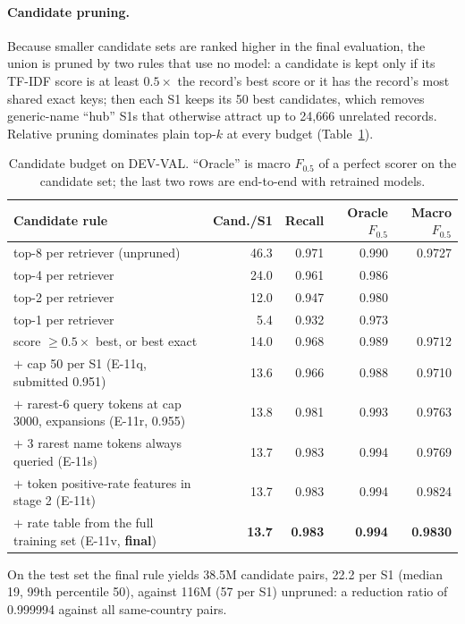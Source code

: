 \documentclass[10pt]{article}
\newcommand{\Fh}{F_{0.5}}
\begin{document}
\paragraph{Candidate pruning.} Because smaller candidate sets are ranked higher in the final evaluation, the union is pruned by two rules that use no model: a candidate is kept only if its TF-IDF score is at least $0.5\times$ the record's best score or it has the record's most shared exact keys; then each S1 keeps its 50 best candidates, which removes generic-name ``hub'' S1s that otherwise attract up to 24{,}666 unrelated records. Relative pruning dominates plain top-$k$ at every budget (Table~\ref{tab:prune}).

\begin{table}[htbp]
\centering\small
\caption{Candidate budget on DEV-VAL. ``Oracle'' is macro $\Fh$ of a perfect scorer on the candidate set; the last two rows are end-to-end with retrained models.}
\label{tab:prune}
\begin{tabular}{@{}lrrrr@{}}
\toprule
Candidate rule & Cand./S1 & Recall & Oracle $\Fh$ & Macro $\Fh$ \\
\midrule
top-8 per retriever (unpruned) & 46.3 & 0.971 & 0.990 & 0.9727 \\
top-4 per retriever & 24.0 & 0.961 & 0.986 & \\
top-2 per retriever & 12.0 & 0.947 & 0.980 & \\
top-1 per retriever & 5.4 & 0.932 & 0.973 & \\
score $\ge 0.5\times$ best, or best exact & 14.0 & 0.968 & 0.989 & 0.9712 \\
\quad $+$ cap 50 per S1 (E-11q, submitted 0.951) & 13.6 & 0.966 & 0.988 & 0.9710 \\
\quad $+$ rarest-6 query tokens at cap 3000, expansions (E-11r, 0.955) & 13.8 & 0.981 & 0.993 & 0.9763 \\
\quad $+$ 3 rarest name tokens always queried (E-11s) & 13.7 & 0.983 & 0.994 & 0.9769 \\
\quad $+$ token positive-rate features in stage 2 (E-11t) & 13.7 & 0.983 & 0.994 & 0.9824 \\
\quad $+$ rate table from the full training set (E-11v, \textbf{final}) & \textbf{13.7} & \textbf{0.983} & \textbf{0.994} & \textbf{0.9830} \\
\bottomrule
\end{tabular}
\end{table}

On the test set the final rule yields 38.5M candidate pairs, 22.2 per S1 (median 19, 99th percentile 50), against 116M (57 per S1) unpruned: a reduction ratio of 0.999994 against all same-country pairs.
\end{document}
